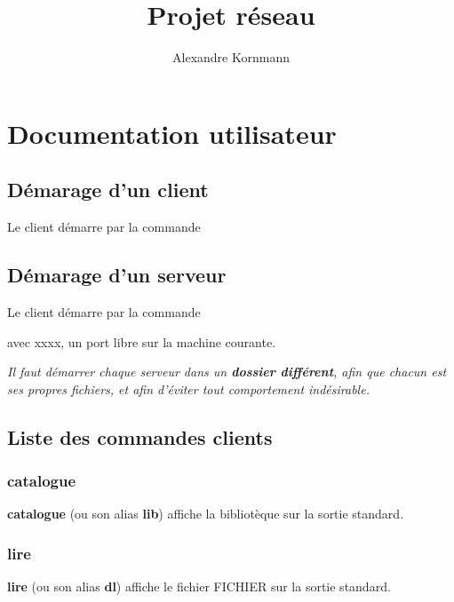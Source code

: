 \documentclass[10pt,a4paper]{article}
\title{Projet réseau}
\author{Alexandre Kornmann}
\begin{document}
\maketitle

\newpage

\tableofcontents

\newpage

\section{Documentation utilisateur}
\subsection{Démarage d'un client}

Le client démarre par la commande
\begin{center}
\end{center}

\subsection{Démarage d'un serveur}

Le client démarre par la commande
\begin{center}
\end{center}avec xxxx, un port libre sur la machine courante. 

\textit{Il faut démarrer chaque serveur dans un \textbf{dossier différent}, afin que chacun est ses propres fichiers, et afin d'éviter tout comportement indésirable.}
\subsection{Liste des commandes clients}

\subsubsection{catalogue}
\begin{center}
\end{center}
\textbf{catalogue} (ou son alias \textbf{lib}) affiche la bibliotèque sur la sortie standard.

\subsubsection{lire}
\begin{center}
\end{center}
\textbf{lire} (ou son alias \textbf{dl}) affiche le fichier FICHIER sur la sortie standard.
\end{document}
